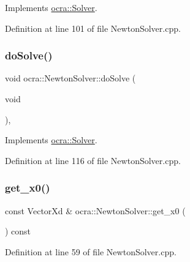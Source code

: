 Implements \hyperlink{classocra_1_1Solver_a9ab90e87025e3da7239141c48d28ab4a}{ocra\+::\+Solver}.



Definition at line 101 of file Newton\+Solver.\+cpp.

\hypertarget{classocra_1_1NewtonSolver_ac49e1e33eb86cb15ac505e638c2fccb9}{}\label{classocra_1_1NewtonSolver_ac49e1e33eb86cb15ac505e638c2fccb9} 
\subsubsection{\texorpdfstring{do\+Solve()}{doSolve()}}
{\footnotesize\ttfamily void ocra\+::\+Newton\+Solver\+::do\+Solve (\begin{DoxyParamCaption}\item[{void}]{ }\end{DoxyParamCaption})\hspace{0.3cm}{\ttfamily [protected]}, {\ttfamily [virtual]}}



Implements \hyperlink{classocra_1_1Solver_ace2d7cfe741611de6dc87a0de7e7f3a9}{ocra\+::\+Solver}.



Definition at line 116 of file Newton\+Solver.\+cpp.

\hypertarget{classocra_1_1NewtonSolver_a073daf2d70c780313d28d34e6c8bbea2}{}\label{classocra_1_1NewtonSolver_a073daf2d70c780313d28d34e6c8bbea2} 
\subsubsection{\texorpdfstring{get\+\_\+x0()}{get\_x0()}}
{\footnotesize\ttfamily const Vector\+Xd \& ocra\+::\+Newton\+Solver\+::get\+\_\+x0 (\begin{DoxyParamCaption}{ }\end{DoxyParamCaption}) const}



Definition at line 59 of file Newton\+Solver.\+cpp.

\hypertarget{classocra_1_1NewtonSolver_aa0f49d597e69f641c28e35b038e91d99}{}\label{classocra_1_1NewtonSolver_aa0f49d597e69f641c28e35b038e91d99} 
